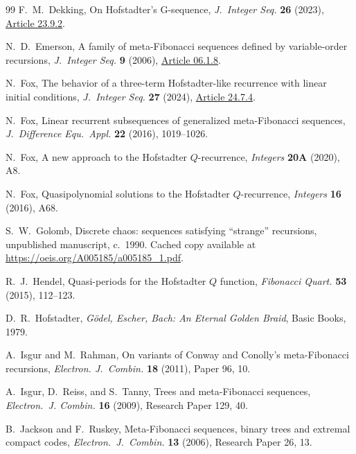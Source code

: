 \documentclass[12pt,reqno]{article}
\theoremstyle{plain}
\theoremstyle{definition}
\theoremstyle{remark}
\begin{document}
\begin{thebibliography}{99}
 F.\ M.\ Dekking, 
 On {H}ofstadter's {G}-sequence, 
 {\it J.\ Integer Seq.} {\bf 26} (2023), \href{https://cs.uwaterloo.ca/journals/JIS/VOL26/Dekking2/dek9.html}{Article 23.9.2}. 

 N.\ D.\ Emerson, 
 A family of meta-Fibonacci sequences defined by variable-order recursions, 
 {\it J.\ Integer Seq.} {\bf 9} (2006), \href{https://cs.uwaterloo.ca/journals/JIS/VOL9/Emerson/emerson6.html}{Article 06.1.8}. 

 N.\ Fox, 
 The behavior of a three-term Hofstadter-like recurrence with linear initial conditions, 
 {\it J.\ Integer Seq.} {\bf 27} (2024), \href{https://cs.uwaterloo.ca/journals/JIS/VOL27/Fox/fox7.html}{Article 24.7.4}. 

 N.\ Fox, 
 Linear recurrent subsequences of generalized meta-{F}ibonacci sequences, 
 {\it J.\ Difference Equ.\ Appl.} {\bf 22} (2016), 1019--1026. 

 N.\ Fox, 
 A new approach to the {H}ofstadter {$Q$}-recurrence, 
 {\it Integers} {\bf 20A} (2020), A8. 

 N.\ Fox, 
 Quasipolynomial solutions to the {H}ofstadter {$Q$}-recurrence, 
 {\it Integers} {\bf 16} (2016), A68. 

 S.\ W.\ Golomb,
 Discrete chaos: sequences satisfying ``strange'' recursions,
 unpublished manuscript, c.~1990.
 Cached copy available at \url{https://oeis.org/A005185/a005185_1.pdf}.

 R.\ J.\ Hendel, 
 Quasi-periods for the {H}ofstadter {$Q$} function, 
 {\it Fibonacci Quart.} {\bf 53} (2015), 112--123. 

 D.\ R.\ Hofstadter,
\emph{G\"odel, Escher, Bach: An Eternal Golden Braid},
Basic Books, 1979.
 
 A.\ Isgur and M.\ Rahman, 
 On variants of {C}onway and {C}onolly's meta-{F}ibonacci recursions, 
 {\it Electron. J.\ Combin.} {\bf 18} (2011), Paper 96, 10. 

 A.\ Isgur, D.\ Reiss, and S.\ Tanny,
 Trees and meta-{F}ibonacci sequences, 
 {\it Electron.\ J. Combin.} {\bf 16} (2009), Research Paper 129, 40. 

 B.\ Jackson and F.\ Ruskey, 
 Meta-{F}ibonacci sequences, binary trees and extremal compact codes, 
 {\it Electron.\ J.\ Combin.} {\bf 13} (2006), Research Paper 26, 13. 


\end{thebibliography}
\end{document}
